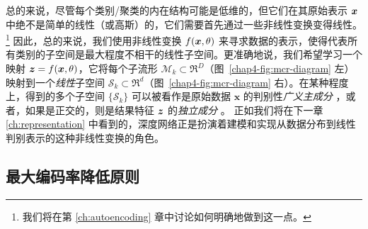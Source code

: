 \documentclass[../../book-main_zh.tex]{subfiles}
\begin{document}
总的来说，尽管每个类别/聚类的内在结构可能是低维的，但它们在其原始表示 $\bm{x}$ 中绝不是简单的线性（或高斯）的，它们需要首先通过一些非线性变换变得线性。\footnote{我们将在第 \ref{ch:autoencoding} 章中讨论如何明确地做到这一点。} 因此，总的来说，我们使用非线性变换 $f(\bm{x},\theta)$ 来寻求数据的表示，使得代表所有类别的子空间是最大程度不相干的线性子空间。更准确地说，我们希望学习一个映射 {$\bm{z} = f(\bm{x},\theta)$}，它将每个子流形 $\mathcal{M}_k \subset \Re^D$（图~\ref{chap4-fig:mcr-diagram} 左）映射到一个{\em 线性}子空间 $\mathcal{S}_k \subset \Re^d$（图~\ref{chap4-fig:mcr-diagram} 右）。在某种程度上，得到的多个子空间 $\{\mathcal{S}_k\}$ 可以被看作是原始数据 $\bm x$ 的判别性{\em 广义主成分} \cite{GPCA}，或者，如果是正交的，则是结果特征 $\bm{z}$ 的{\em 独立成分} \cite{hyvarinen2000independent}。
正如我们将在下一章 \ref{ch:representation} 中看到的，深度网络正是扮演着建模和实现从数据分布到线性判别表示的这种非线性变换的角色。


\subsection{最大编码率降低原则}\label{subsec:MCR2}



\end{document}
